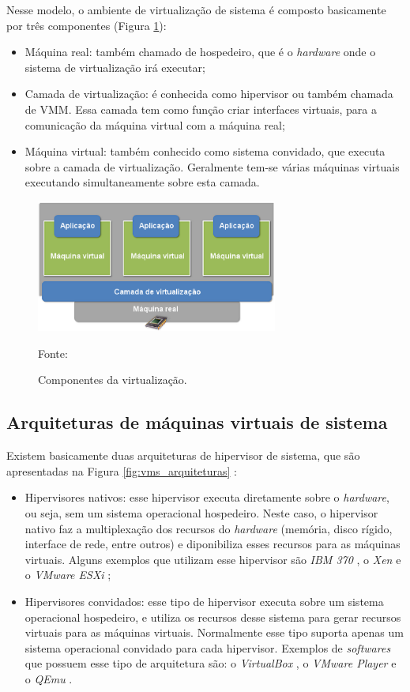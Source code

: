 Nesse modelo, o ambiente de virtualização de sistema é composto basicamente por três componentes (Figura \ref{fig:virtcomponentes}):
\begin{itemize}
 \item Máquina real: também chamado de hospedeiro, que é o \textit{hardware} onde o sistema de virtualização irá executar;
 \item Camada de virtualização: é conhecida como hipervisor ou também chamada de \ac{VMM}. Essa camada tem como função criar interfaces 
 virtuais, para a comunicação da máquina virtual com a máquina real;
 \item Máquina virtual: também conhecido como sistema convidado, que executa sobre a camada de virtualização. Geralmente tem-se
 várias máquinas virtuais executando simultaneamente sobre esta camada.
\end{itemize}

\begin{figure}[virtcomponentes]
 \centering
 \includegraphics[width=300px]{img/virtcomponentes.eps}
 \caption{Componentes da virtualização.}
 \label{fig:virtcomponentes}
 Fonte: \citet{andrade2011}
\end{figure}

\subsection{Arquiteturas de máquinas virtuais de sistema}
\label{section:virtarquit}

Existem basicamente duas arquiteturas de hipervisor de sistema, que são apresentadas na Figura \ref{fig:vms_arquiteturas} \cite{maziero2013}:
\begin{itemize}
 \item Hipervisores nativos: esse hipervisor executa diretamente sobre o \textit{hardware}, ou seja, sem um sistema operacional
 hospedeiro. Neste caso, o hipervisor nativo faz a multiplexação dos recursos do \textit{hardware} (memória, disco rígido, interface de rede, 
 entre outros) e diponibiliza esses recursos para as máquinas virtuais. Alguns exemplos que utilizam esse hipervisor são 
 \textit{IBM 370} \cite{ibm370}, o \textit{Xen} \cite{xen} e o \textit{VMware ESXi} \cite{vmwareesxi};
 \item Hipervisores convidados: esse tipo de hipervisor executa sobre um sistema operacional hospedeiro, e utiliza os recursos 
 desse sistema para gerar recursos virtuais para as máquinas virtuais. Normalmente esse tipo suporta apenas um sistema 
 operacional convidado para cada hipervisor. Exemplos de \textit{softwares} que possuem esse tipo de arquitetura são: o 
 \textit{VirtualBox} \cite{virtualbox}, o \textit{VMware Player} \cite{vmwareplayer} e o \textit{QEmu} \cite{qemu}.
\end{itemize}

